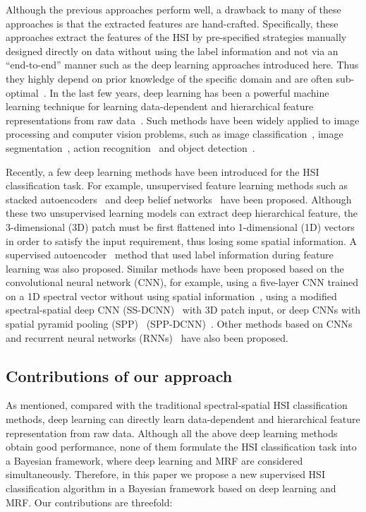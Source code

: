 \documentclass[journal]{IEEEtran}
\begin{document}
	{{Although the previous approaches perform well}}, a drawback to {{many of these approaches}} is that the extracted features are hand-crafted. Specifically, {{these approaches extract the features of the HSI by pre-specified strategies manually designed directly on data without using the label information and not via an ``end-to-end'' manner such as the deep learning approaches introduced here. Thus they}} highly depend on prior knowledge of the specific domain and are often sub-optimal~\cite{zhang2017spectral}. In the last few years, deep learning has been a powerful machine learning technique for learning data-dependent and hierarchical feature representations from raw data~\cite{Goodfellow-et-al-2016}. Such methods have been widely applied to image processing and computer vision problems, such as image classification~\cite{krizhevsky2012imagenet}, image segmentation~\cite{chen2014semantic}, action recognition~\cite{ji20133d} and object detection~\cite{szegedy2013deep}.
	
	Recently, a few deep learning methods have been introduced for the HSI classification task. For example, unsupervised feature learning methods such as stacked autoencoders~\cite{chen2014deep} and deep belief networks~\cite{chen2015spectral} have been proposed. Although these two unsupervised learning models can extract deep hierarchical feature, the 3-dimensional (3D) patch must be first flattened into 1-dimensional (1D) vectors in order to satisfy the input requirement, thus losing some spatial information. A supervised autoencoder~\cite{lin2013spectral} method that used label information during feature learning was also proposed. Similar methods have been proposed based on the convolutional neural network (CNN), for example, using a five-layer CNN trained on a 1D spectral vector without using spatial information~\cite{hu2015deep}, using a modified spectral-spatial deep CNN (SS-DCNN)~\cite{yue2015spectral} with 3D 
	patch input, or deep CNNs with spatial pyramid pooling (SPP)~\cite{he2014spatial} (SPP-DCNN)~\cite{yue2016deep}. Other methods based on CNNs~\cite{paisitkriangkrai2015effective,zhang2017spectral} and  recurrent neural networks (RNNs)~\cite{mou2017deep} have also been proposed.
 	
	\subsection{Contributions of our approach}
	As mentioned, compared with the traditional spectral-spatial HSI classification methods, deep learning can directly learn data-dependent and hierarchical feature representation from raw data. Although all the above deep learning methods obtain good performance, none of them formulate the HSI classification task into a Bayesian framework, where deep learning and MRF are considered simultaneously. Therefore, in this paper we propose a new supervised HSI {{classification}} algorithm in a Bayesian framework based on deep learning and MRF. Our contributions are threefold:
	
\end{document}
